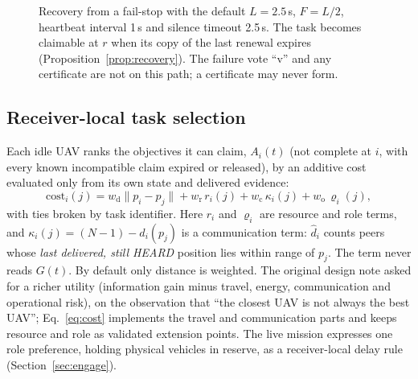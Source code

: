 \documentclass[conference]{IEEEtran}
\newcommand{\stt}[1]{\textsf{#1}}     %
\begin{document}
\begin{figure}[t]
{}
\caption{Recovery from a fail-stop with the default $L=2.5$\,s, $F=L/2$,
heartbeat interval 1\,s and silence timeout 2.5\,s. The task becomes
claimable at $r$ when its copy of the last renewal expires
(Proposition~\ref{prop:recovery}). The failure vote ``v'' and any certificate
are not on this path; a certificate may never form.}
\label{fig:lease}
\end{figure}

\subsection{Receiver-local task selection}
\label{sec:utility}

Each idle UAV ranks the objectives it can claim, $A_i(t)$ (not complete at
$i$, with every known incompatible claim expired or released), by an additive
cost evaluated only from its own state and delivered evidence:
\begin{equation}
  \mathrm{cost}_i(j)=w_{\mathrm{d}}\lVert p_i-p_j\rVert
  + w_{\mathrm{r}}\,r_i(j) + w_{\mathrm{c}}\,\kappa_i(j) + w_{\mathrm{o}}\,\varrho_i(j),
  \label{eq:cost}
\end{equation}
with ties broken by task identifier. Here $r_i$ and $\varrho_i$ are resource
and role terms, and $\kappa_i(j)=(N-1)-\hat d_i(p_j)$ is a
communication term: $\hat d_i$ counts peers whose \emph{last delivered,
still \stt{HEARD}} position lies within range of $p_j$. The term never reads
$G(t)$. By default only distance is weighted. The original design note asked
for a richer utility (information gain minus travel, energy, communication
and operational risk), on the observation that ``the closest UAV is not always
the best UAV''; Eq.~\eqref{eq:cost} implements the travel and communication
parts and keeps resource and role as validated extension points. The live
mission expresses one role preference, holding physical vehicles in reserve,
as a receiver-local delay rule (Section~\ref{sec:engage}).
\end{document}
